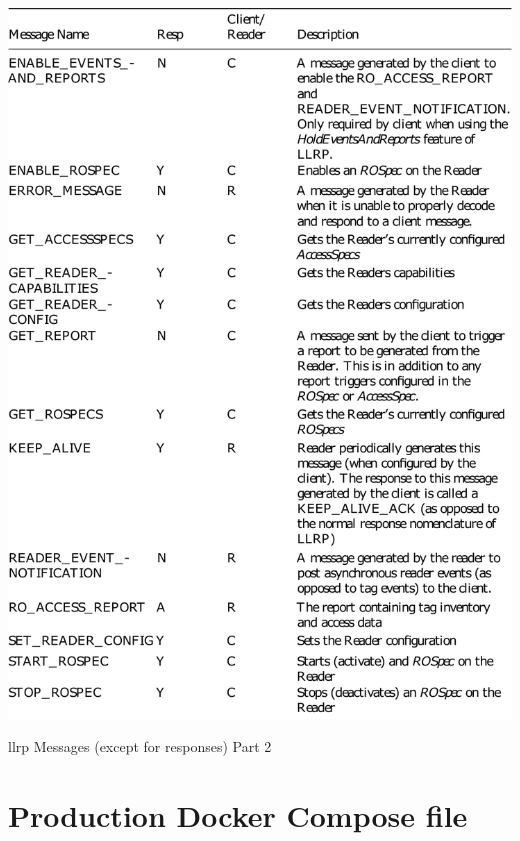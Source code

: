 \begin{appendices}
\begin{table}
    \centering
    \includegraphics[width=\textwidth]{./figs/02-state-of-the-art/table_llrpmessages_2.pdf}
    \caption[\ac{llrp} Messages (except for responses) Part 2]{\ac{llrp} Messages (except for responses) Part 2~\cite{ImpinjLTKProgrammers}} 
    \label{tab:llrpmessages2}
\end{table}

\section{Production Docker Compose file} \label{apx:composefile}
\inputminted[linenos, breaklines]{yaml}{./code/docker-compose-production.yml}

\end{appendices}